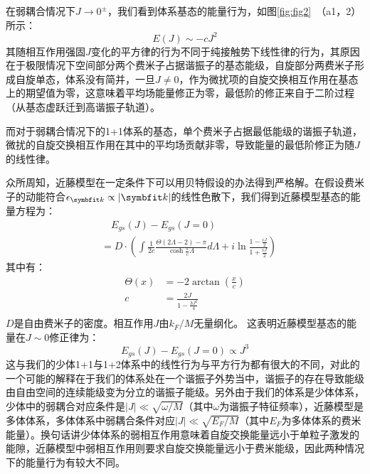 在弱耦合情况下$J\to0^{\pm}$，我们看到体系基态的能量行为，如图\ref{fig:fig2}~（a1，2）所示：
\begin{equation}
    E(J)\sim -cJ^2
\end{equation}
其随相互作用强固$J$变化的平方律的行为不同于纯接触势下线性律的行为，其原因在于极限情况下空间部分两个费米子占据谐振子的基态能级，自旋部分两费米子形成自旋单态，体系没有简并，一旦$J\neq0$，作为微扰项的自旋交换相互作用在基态上的期望值为零，这意味着平均场能量修正为零，最低阶的修正来自于二阶过程（从基态虚跃迁到高谐振子轨道）。

而对于弱耦合情况下的1+1体系的基态，单个费米子占据最低能级的谐振子轨道，微扰的自旋交换相互作用在其中的平均场贡献非零，导致能量的最低阶修正为随$J$的线性律。

众所周知，近藤模型在一定条件下可以用贝特假设的办法得到严格解\cite{andrei1983solution,tsvelick1982exact}。在假设费米子的动能符合$\epsilon_{\Vector{k}}\propto|\Vector{k}|$的线性色散下，我们得到近藤模型基态的能量方程为：
\begin{equation}
    \begin{split}
        &\quad E_{gs}(J)-E_{gs}(J=0) \\
        &= D\cdot\left( \int\frac{1}{2c}\frac{\Theta(2\Lambda-2)-\pi}{\cosh\frac{\pi}{c}\Lambda}d\Lambda +i\ln\frac{1-\frac{iJ}{2}}{1+\frac{iJ}{2}} \right)
        \end{split}
\end{equation}
其中有：
\begin{equation}
    \begin{split}
    \Theta(x) &= -2\arctan(\frac{x}{c})\\
    c &= \frac{2J}{1-\frac{3J^2}{4}}\\
    \end{split}
\end{equation}
$D$是自由费米子的密度。相互作用$J$由$k_F/M$无量纲化。
这表明近藤模型基态的能量在$J\sim0$修正律为：
\begin{equation}
    E_{gs}(J)-E_{gs}(J=0) \propto J^3
\end{equation}
这与我们的少体1+1与1+2体系中的线性行为与平方行为都有很大的不同，对此的一个可能的解释在于我们的体系处在一个谐振子外势当中，谐振子的存在导致能级由自由空间的连续能级变为分立的谐振子能级。另外由于我们的体系是少体体系，少体中的弱耦合对应条件是$|J|\ll \sqrt{\omega/M}$（其中$\omega$为谐振子特征频率），近藤模型是多体体系，多体体系中弱耦合条件对应$|J|\ll \sqrt{E_F/M}$（其中$E_F$为多体体系的费米能量）。换句话讲少体体系的弱相互作用意味着自旋交换能量远小于单粒子激发的能隙，近藤模型中弱相互作用则要求自旋交换能量远小于费米能级，因此两种情况下的能量行为有较大不同。

